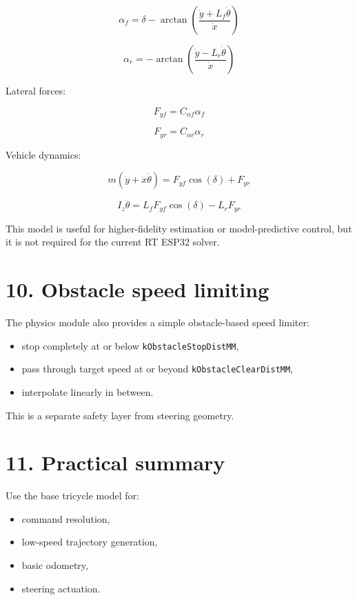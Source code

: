 \documentclass[12pt,a4paper,oneside]{report}
\providecommand{\tightlist}{\setlength{\itemsep}{0pt}\setlength{\parskip}{0pt}}
\begin{document}
\[
\alpha_f = \delta - \arctan\left(\frac{\dot{y} + L_f \dot{\theta}}{\dot{x}}\right)
\]

\[
\alpha_r = -\arctan\left(\frac{\dot{y} - L_r \dot{\theta}}{\dot{x}}\right)
\]

Lateral forces:

\[
F_{yf} = C_{\alpha f}\alpha_f
\]

\[
F_{yr} = C_{\alpha r}\alpha_r
\]

Vehicle dynamics:

\[
m(\ddot{y} + \dot{x}\dot{\theta}) = F_{yf}\cos(\delta) + F_{yr}
\]

\[
I_z \ddot{\theta} = L_fF_{yf}\cos(\delta) - L_rF_{yr}
\]

This model is useful for higher-fidelity estimation or model-predictive control,
but it is not required for the current RT ESP32 solver.

\section{10. Obstacle speed limiting}\label{obstacle-speed-limiting}

The physics module also provides a simple obstacle-based speed limiter:

\begin{itemize}
\tightlist
\item
  stop completely at or below \texttt{kObstacleStopDistMM},
\item
  pass through target speed at or beyond \texttt{kObstacleClearDistMM},
\item
  interpolate linearly in between.
\end{itemize}

This is a separate safety layer from steering geometry.

\section{11. Practical summary}\label{practical-summary}

Use the base tricycle model for:

\begin{itemize}
\tightlist
\item
  command resolution,
\item
  low-speed trajectory generation,
\item
  basic odometry,
\item
  steering actuation.
\end{itemize}
\end{document}
